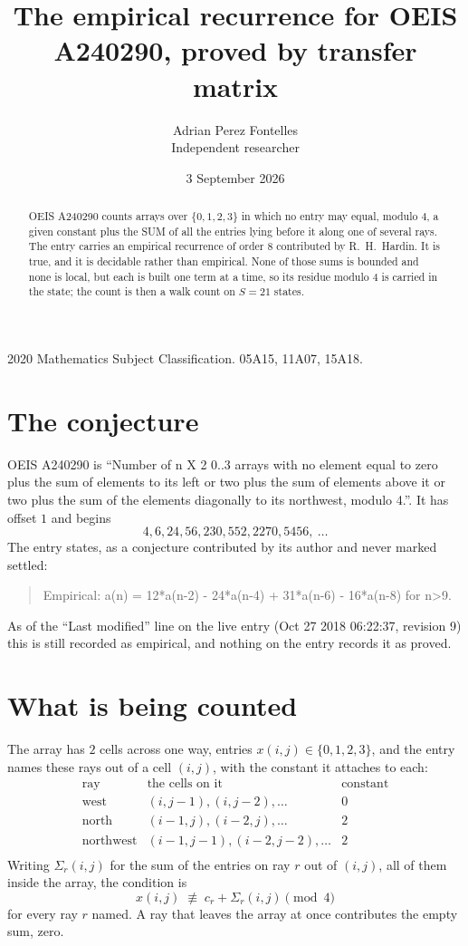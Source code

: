 \documentclass[11pt,a4paper]{article}
\title{The empirical recurrence for OEIS A240290, proved by transfer matrix}
\author{Adrian Perez Fontelles\\ \small Independent researcher}
\date{3 September 2026}
\theoremstyle{plain}
\theoremstyle{definition}
\begin{document}
\maketitle

\begin{abstract}
OEIS A240290 counts arrays over $\{0,1,2,3\}$ in which no entry may equal, modulo $4$, a given
constant plus the SUM of all the entries lying before it along one of several rays. The entry
carries an empirical recurrence of order $8$ contributed by R.~H.~Hardin. It is true, and
it is decidable rather than empirical. None of those sums is bounded and none is local, but
each is built one term at a time, so its residue modulo $4$ is carried in the state; the
count is then a walk count on $S=21$ states.
\end{abstract}

\noindent\small 2020 Mathematics Subject Classification. 05A15, 11A07, 15A18.\normalsize

\section{The conjecture}

OEIS A240290 is ``Number of n X 2 0..3 arrays with no element equal to zero plus the sum of elements to its left or two plus the sum of elements above it or two plus the sum of the elements diagonally to its northwest, modulo 4.''. It has offset $1$ and begins
\[
4, 6, 24, 56, 230, 552, 2270, 5456,\ \dots
\]
The entry states, as a conjecture contributed by its author and never marked settled:
\begin{quote}
Empirical: a(n) = 12*a(n-2) - 24*a(n-4) + 31*a(n-6) - 16*a(n-8) for n>9.
\end{quote}
As of the ``Last modified'' line on the live entry (Oct 27 2018 06:22:37, revision 9) this is still
recorded as empirical, and nothing on the entry records it as proved.

\section{What is being counted}

The array has $2$ cells across one way, entries $x(i,j)\in\{0,1,2,3\}$, and the entry names these
rays out of a cell $(i,j)$, with the constant it attaches to each:
\[
\begin{array}{lll}
\text{ray} & \text{the cells on it} & \text{constant} \\[2pt]
\text{west} & (i,j-1),(i,j-2),\dots & 0 \\
\text{north} & (i-1,j),(i-2,j),\dots & 2 \\
\text{northwest} & (i-1,j-1),(i-2,j-2),\dots & 2 \\
\end{array}
\]
Writing $\Sigma_r(i,j)$ for the sum of the entries on ray $r$ out of $(i,j)$, all of them
inside the array, the condition is
\[
x(i,j)\;\not\equiv\;c_r+\Sigma_r(i,j) \pmod{4}
\]
for every ray $r$ named. A ray that leaves the array at once contributes the empty sum,
zero.
\end{document}
